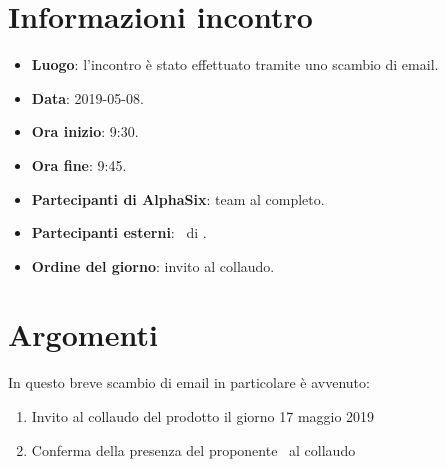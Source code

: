 \newcommand{\documento}{\VE}
\newcommand{\nomedocumentofisico}{VE\_2019-05-08.pdf}
\newcommand{\redazione}{\NC}
\newcommand{\verifica}{\CV}
\newcommand{\approvazione}{\TG}
\newcommand{\versione}{1.0.0}
\newcommand{\uso}{Esterno}
\newcommand{\destinateTo}{\TV, \\ & \RC, \\ & \II}
\newcommand{\datacreazione}{08 maggio 2019}
\newcommand{\datamodifica}{10 maggio 2019}
\newcommand{\stato}{Approvato}

\def\TABELLE{false}	%
\def\FIGURE{false} 	%






    

    

    \section{Informazioni incontro}
    	\begin{itemize}
    		\item \textbf{Luogo}: l'incontro è stato effettuato tramite uno scambio di email.
    		\item \textbf{Data}: 2019-05-08.
    		\item \textbf{Ora inizio}: 9:30.
    		\item \textbf{Ora fine}: 9:45.
    		\item \textbf{Partecipanti di AlphaSix}: team al completo.
    		\item \textbf{Partecipanti esterni}: \LuC~di \II.
    		\item \textbf{Ordine del giorno}: invito al collaudo.

    	\end{itemize}

    \section{Argomenti}
    In questo breve scambio di email in particolare è avvenuto:
    \begin{enumerate}
        \item Invito al collaudo del prodotto il giorno 17 maggio 2019
        \item Conferma della presenza del proponente \LuC\ al collaudo
    \end{enumerate}

